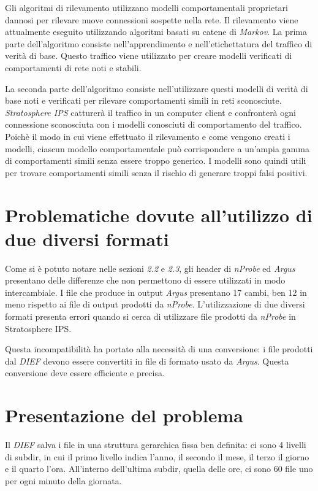 \documentclass[../main.tex]{subfiles}
\begin{document}
Gli algoritmi di rilevamento utilizzano modelli comportamentali proprietari dannosi per rilevare nuove connessioni sospette nella rete. Il rilevamento viene attualmente eseguito utilizzando algoritmi basati su catene di \textit{Markov}.
La prima parte dell'algoritmo consiste nell'apprendimento e nell'etichettatura del traffico di verità di base. Questo traffico viene utilizzato per creare modelli verificati di comportamenti di rete noti e stabili. \newline

La seconda parte dell'algoritmo consiste nell'utilizzare questi modelli di verità di base noti e verificati per rilevare comportamenti simili in reti sconosciute. \textit{Stratosphere IPS} catturerà il traffico in un computer client e confronterà ogni connessione sconosciuta con i modelli conosciuti di comportamento del traffico. Poichè il modo in cui viene effettuato il rilevamento e come vengono creati i modelli, ciascun modello comportamentale può corrispondere a un'ampia gamma di comportamenti simili senza essere troppo generico. I modelli sono quindi utili per trovare comportamenti simili senza il rischio di generare troppi falsi positivi.


\section{Problematiche dovute all'utilizzo di due diversi formati}
Come si è potuto notare nelle sezioni \textit{2.2} e \textit{2.3}, gli header di \textit{nProbe} ed \textit{Argus} presentano delle differenze che non permettono di essere utilizzati in modo intercambiale. I file che produce in output \textit{Argus} presentano 17 cambi, ben 12 in meno rispetto ai file di output prodotti da \textit{nProbe}.
L'utilizzazione di due diversi formati presenta errori quando si cerca di utilizzare file prodotti da \textit{nProbe} in Stratosphere IPS. \newline

Questa incompatibilità ha portato alla necessità di una conversione: i file prodotti dal \textit{DIEF} devono essere convertiti in file di formato usato da \textit{Argus}. Questa conversione deve essere efficiente e precisa.

\section{Presentazione del problema}
Il \textit{DIEF} salva i file in una struttura gerarchica fissa ben definita: ci sono 4 livelli di subdir, in cui il primo livello indica l'anno, il secondo il mese, il terzo il giorno e il quarto l'ora. All'interno dell'ultima subdir, quella delle ore, ci sono 60 file uno per ogni minuto della giornata.
\end{document}
